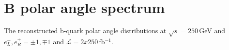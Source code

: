 

\section*{B polar angle spectrum}

The reconstructed b-quark polar angle distributions at $\sqrt{s} = 250$\,GeV and $e^-_L, e^+_R = \pm1, \mp1$ and $\mathcal{L} = 2x250 $\,fb$^{-1}$.
